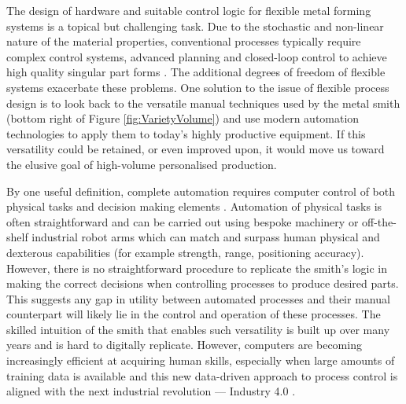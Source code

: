 The design of hardware and suitable control logic for flexible metal forming systems is a topical but challenging task. Due to the stochastic and non-linear nature of the material properties, conventional processes typically require complex control systems, advanced planning and closed-loop control to achieve high quality singular part forms \citep{Allwood2016Closed-loopForming, Tekkaya2015MetalProperties, Polyblank2014Closed-loopProspectus}. The additional degrees of freedom of flexible systems exacerbate these problems. One solution to the issue of flexible process design is to look back to the versatile manual techniques used by the metal smith (bottom right of Figure \ref{fig:VarietyVolume}) and use modern automation technologies to apply them to today’s highly productive equipment. If this versatility could be retained, or even improved upon, it would move us toward the elusive goal of high-volume personalised production. 



By one useful definition, complete automation requires computer control of both physical tasks and decision making elements \citep{Frohm2008LevelsManufacturing}. Automation of physical tasks is often straightforward and can be carried out using bespoke machinery or off-the-shelf industrial robot arms which can match and surpass human physical and dexterous capabilities (for example strength, range, positioning accuracy). However, there is no straightforward procedure to replicate the smith's logic in making the correct decisions when controlling processes to produce desired parts. This suggests any gap in utility between automated processes and their manual counterpart will likely lie in the control and operation of these processes. The skilled intuition of the smith that enables such versatility is built up over many years and is hard to digitally replicate. However, computers are becoming increasingly efficient at acquiring human skills, especially when large amounts of training data is available \citep{Ford2016TheUnemployment} and this new data-driven approach to process control is aligned with the next industrial revolution --- Industry 4.0 \citep{Zhong2017IntelligentReview}. 

